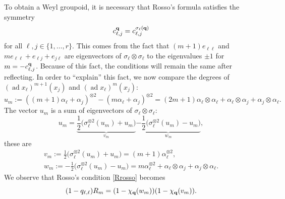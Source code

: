 \documentclass[10pt,a4paper]{amsart}
\numberwithin{equation}{section}
\newcommand{\qq }{{\bf q}}
\DeclareMathOperator{\ad}{ad}
\newcommand{\bich }{\chi}
\begin{document}
To obtain a Weyl groupoid, it is necessary that Rosso's formula satisfies the symmetry
\begin{gather*}%
c^\qq_{\ell,j} = c^{\sigma_\ell(\qq)}_{\ell,j}
\end{gather*}
for all $\ell,j\in \{1,\dots,r\}$. This comes from the fact that
$(m+1) e_{\ell \ell}$ and $m e_{\ell \ell}+e_{\ell j}+e_{j \ell}$ are eigenvectors of $\sigma_\ell \otimes \sigma_\ell$ to the eigenvalues $\pm 1$ for $m = -c^\qq_{\ell,j}$.
Because of this fact, the conditions will remain the same after reflecting.
In order to ``explain'' this fact, we now compare the degrees of $(\ad x_\ell)^{m+1}(x_j)$ and $(\ad x_\ell)^{m}(x_j)$:
\[ u_m := ((m+1)\alpha_\ell+\alpha_j)^{\otimes 2} - (m\alpha_\ell+\alpha_j)^{\otimes 2} = (2m+1)\alpha_\ell\otimes\alpha_\ell + \alpha_\ell\otimes \alpha_j + \alpha_j\otimes \alpha_\ell. \]
The vector $u_m$ is a sum of eigenvectors of $\sigma_\ell\otimes\sigma_\ell$:
\[ u_m = \underbrace{\frac{1}{2}\big(\sigma_\ell^{\otimes 2}(u_m)+u_m\big)}_{v_m}
\underbrace{-\frac{1}{2}\big(\sigma_\ell^{\otimes 2}(u_m)-u_m\big)}_{w_m}
, \]
these are
\begin{gather*}
v_m := \frac{1}{2}\big(\sigma_\ell^{\otimes 2}(u_m)+u_m\big)
 = (m+1)\alpha_\ell^{\otimes 2}
, \\
w_m := -\frac{1}{2}\big(\sigma_\ell^{\otimes 2}(u_m)-u_m\big)
 = m\alpha_\ell^{\otimes 2}+\alpha_\ell\otimes \alpha_j + \alpha_j\otimes \alpha_\ell.
\end{gather*}
We observe that Rosso's condition \eqref{Rrosso} becomes
\begin{equation}\label{R_add}
(1-q_{\ell,\ell})R_{m} = (1-\bich_\qq(w_m))(1-\bich_\qq(v_m)).
\end{equation}
\end{document}
